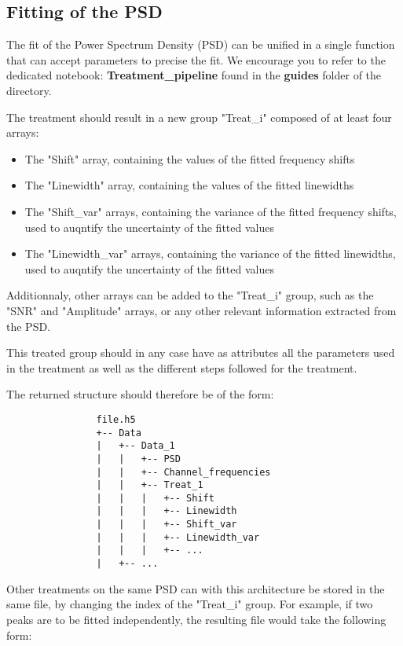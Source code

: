 \documentclass{article}
\begin{document}
        \subsection{Fitting of the PSD}

            The fit of the Power Spectrum Density (PSD) can be unified in a single function that can accept parameters to precise the fit. We encourage you to refer to the dedicated notebook: \textbf{Treatment\_pipeline} found in the \textbf{guides} folder of the directory.

            The treatment should result in a new group "Treat\_i" composed of at least four arrays:
            \begin{itemize}
                \item The "Shift" array, containing the values of the fitted frequency shifts
                \item The "Linewidth" array, containing the values of the fitted linewidths
                \item The "Shift\_var" arrays, containing the variance of the fitted frequency shifts, used to auqntify the uncertainty of the fitted values
                \item The "Linewidth\_var" arrays, containing the variance of the fitted linewidths, used to auqntify the uncertainty of the fitted values
            \end{itemize}

            Additionnaly, other arrays can be added to the "Treat\_i" group, such as the "SNR" and "Amplitude" arrays, or any other relevant information extracted from the PSD.

            This treated group should in any case have as attributes all the parameters used in the treatment as well as the different steps followed for the treatment. 

            The returned structure should therefore be of the form:
            \begin{verbatim}
                file.h5
                +-- Data
                |   +-- Data_1
                |   |   +-- PSD
                |   |   +-- Channel_frequencies
                |   |   +-- Treat_1
                |   |   |   +-- Shift
                |   |   |   +-- Linewidth
                |   |   |   +-- Shift_var
                |   |   |   +-- Linewidth_var
                |   |   |   +-- ...
                |   +-- ...
            \end{verbatim}

            Other treatments on the same PSD can with this architecture be stored in the same file, by changing the index of the "Treat\_i" group. For example, if two peaks are to be fitted independently, the resulting file would take the following form:
\end{document}
